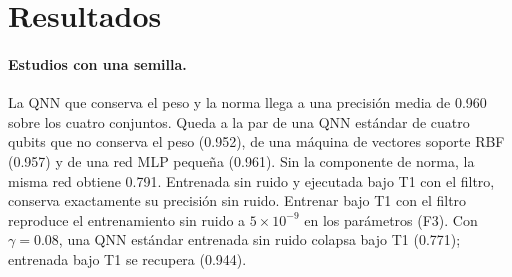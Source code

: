 \documentclass[11pt]{article}
\begin{document}
\section{Resultados}

\paragraph{Estudios con una semilla.} La QNN que conserva el peso y la norma llega a una precisión media de
0.960 sobre los cuatro conjuntos. Queda a la par de una QNN estándar de cuatro qubits que no conserva el peso
(0.952), de una máquina de vectores soporte RBF (0.957) y de una red MLP pequeña (0.961). Sin la componente de
norma, la misma red obtiene 0.791. Entrenada sin ruido y ejecutada bajo T1 con el filtro, conserva exactamente su
precisión sin ruido. Entrenar bajo T1 con el filtro reproduce el entrenamiento sin ruido a $5\times10^{-9}$ en los
parámetros (F3). Con $\gamma=0.08$, una QNN estándar entrenada sin ruido colapsa bajo T1 (0.771); entrenada bajo
T1 se recupera (0.944).
\end{document}
